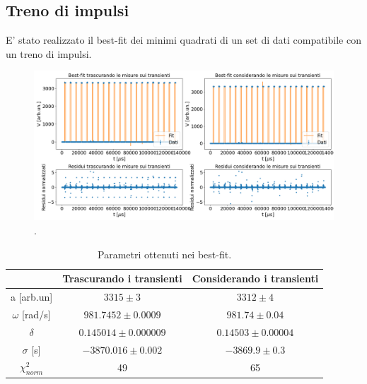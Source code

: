 \documentclass{article}
\begin{document}
    \subsection{Treno di impulsi}
        E' stato realizzato il best-fit dei minimi quadrati
        di un set di dati compatibile con un treno di impulsi.
            \begin{figure}[H]            
                        
                \includegraphics[width=1\textwidth]{bestfit_train.png} %
                \caption{.
                }
                \label{fig:bestfit_train}
            \end{figure}    

            \begin{table}[H]
                \centering
                \begin{tabular}{ccc}
                    \hline
                               & Trascurando i transienti              &Considerando i transienti\\
                    \hline
                    a [arb.un]          & $3315 \pm 3$                          & $3312\pm 4$    \\
                    $\omega$ [rad/s]    & $981.7452\pm 0.0009$                  & $981.74\pm 0.04$ \\
                    $\delta$            & $0.145014\pm 0.000009$                & $0.14503\pm 0.00004$   \\
                    $\sigma$ [s]        & $-3870.016 \pm 0.002$                 & $-3869.9 \pm 0.3$  \\
                    $\chi^{2}_{norm}$   & 49                                    & 65 \\
                    \hline
                \end{tabular}
                \caption{Parametri ottenuti nei best-fit.}
                \label{tab:bestfit_triangle}
            \end{table}
\end{document}
